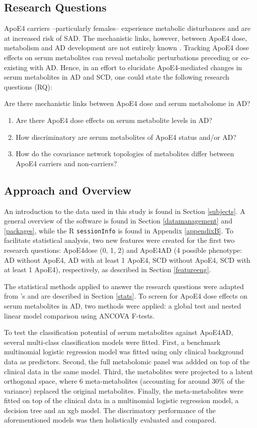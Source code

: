 \documentclass{amsart}
\begin{document}
\newpage
\subsection{Research Questions}
ApoE4 carriers --particularly females-- experience metabolic disturbances and are at increased risk of SAD. The mechanistic links, however, between ApoE4 dose, metabolism and AD development are not entirely known \cite{Fernandez-Calle2022APOEDiseases}. Tracking ApoE4 dose effects on serum metabolites can reveal metabolic perturbations preceding or co-existing with AD. Hence, in an effort to elucidate ApoE4-mediated changes in serum metabolites in AD and SCD, one could state the following research questions (RQ):

Are there mechanistic links between ApoE4 dose and serum metabolome in AD?
\begin{enumerate}
    \item Are there ApoE4 dose effects on serum metabolite levels in AD?
    \item How discriminatory are serum metabolites of ApoE4 status and/or AD?
    \item How do the covariance network topologies of metabolites differ between ApoE4 carriers and non-carriers?
\end{enumerate}

\subsection{Approach and Overview}
An introduction to the data used in this study is found in Section \ref{subjects}. A general overview of the software is found in Section \ref{datamanagement} and \ref{packages}, while the R \texttt{sessionInfo} is found in Appendix \ref{appendixB}. To facilitate statistical analysis, two new features were created for the first two research questions: ApoE4dose (0, 1, 2) and ApoE4AD (4 possible phenotype: AD without ApoE4, AD with at least 1 ApoE4, SCD without ApoE4, SCD with at least 1 ApoE4), respectively, as described in Section \ref{featureeng}.

The statistical methods applied to answer the research questions were adapted from 's  and are described in Section \ref{stats}. To screen for ApoE4 dose effects on serum metabolites in AD, two methods were applied: a global test and nested linear model comparison using ANCOVA F-tests. 

To test the classification potential of serum metabolites against ApoE4AD, several multi-class classification models were fitted. First, a benchmark multinomial logistic regression model was fitted using only clinical background data as predictors. Second, the full metabolomic panel was addded on top of the clinical data in the same model. Third, the metabolites were projected to a latent orthogonal space, where 6 meta-metabolites (accounting for around 30\% of the variance) replaced the original metabolites. Finally, the meta-metabolites were fitted on top of the clinical data in a multinomial logistic regression model, a decision tree and an \acrfull{xgb} model. The discrimatory performance of the aforementioned models was then holistically evaluated and compared.
\end{document}
